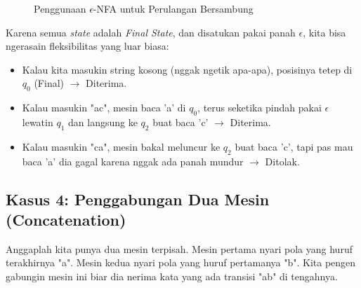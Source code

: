 \documentclass[12pt,a4paper]{article}
\begin{document}
\begin{figure}[h]
    \centering
    \caption{Penggunaan $\epsilon$-NFA untuk Perulangan Bersambung}
\end{figure}

Karena semua \textit{state} adalah \textit{Final State}, dan disatukan pakai panah $\epsilon$, kita bisa ngerasain fleksibilitas yang luar biasa:
\begin{itemize}
    \item Kalau kita masukin string kosong (nggak ngetik apa-apa), posisinya tetep di $q_0$ (Final) $\rightarrow$ Diterima.
    \item Kalau masukin "ac", mesin baca 'a' di $q_0$, terus seketika pindah pakai $\epsilon$ lewatin $q_1$ dan langsung ke $q_2$ buat baca 'c' $\rightarrow$ Diterima.
    \item Kalau masukin "ca", mesin bakal meluncur ke $q_2$ buat baca 'c', tapi pas mau baca 'a' dia gagal karena nggak ada panah mundur $\rightarrow$ Ditolak.
\end{itemize}

\subsection{Kasus 4: Penggabungan Dua Mesin (Concatenation)}
Anggaplah kita punya dua mesin terpisah. Mesin pertama nyari pola yang huruf terakhirnya "a". Mesin kedua nyari pola yang huruf pertamanya "b". Kita pengen gabungin mesin ini biar dia nerima kata yang ada transisi "ab" di tengahnya.
\end{document}
